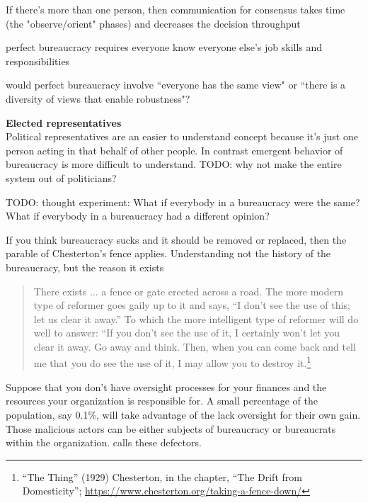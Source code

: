 
If there's more than one person, then communication for consensus takes time (the "observe/orient" phases) and decreases the decision throughput

perfect bureaucracy requires everyone know everyone else's job skills and responsibilities

would perfect bureaucracy involve ``everyone has the same view" or ``there is a diversity of views that enable robustness"?



\textbf{Elected representatives}\\
Political representatives are an easier to understand concept because it's just one person acting in that behalf of other people.
In contrast emergent behavior of bureaucracy is more difficult to understand. 
TODO: why not make the entire system out of politicians?


TODO: thought experiment: 
What if everybody in a bureaucracy were the same?
What if everybody in a bureaucracy had a different opinion?


If you think bureaucracy sucks and it should be removed or replaced, then the parable of Chesterton's fence applies. Understanding not the history of the bureaucracy, but the reason it exists

\begin{quote}
There exists ... a fence or gate erected across a road. The more modern type of reformer goes gaily up to it and says, “I don’t see the use of this; let us clear it away.” To which the more intelligent type of reformer will do well to answer: “If you don’t see the use of it, I certainly won’t let you clear it away. Go away and think. Then, when you can come back and tell me that you do see the use of it, I may allow you to destroy it.\footnote{``The Thing'' (1929) Chesterton, in the chapter, ``The Drift from Domesticity''; \href{https://www.chesterton.org/taking-a-fence-down/}{https://www.chesterton.org/taking-a-fence-down/}}
\end{quote}

Suppose that you don't have oversight processes for your finances and the resources your organization is responsible for. A small percentage of the population, say 0.1\%, will take advantage of the lack oversight for their own gain. Those malicious actors can be either subjects of bureaucracy or bureaucrats within the organization. 
\cite{2012_Schneier} calls these defectors.

